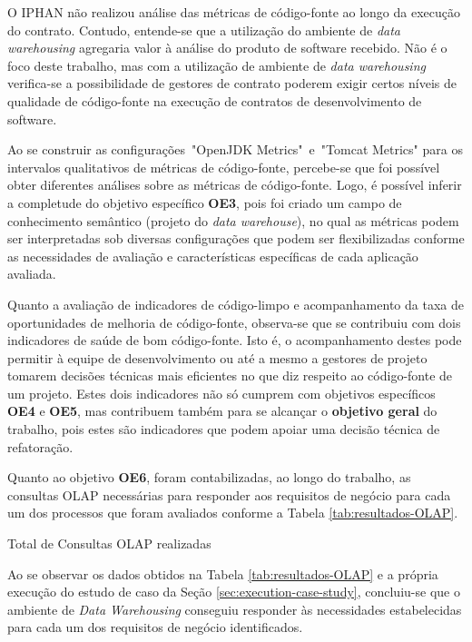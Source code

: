 O IPHAN não realizou análise das métricas de código-fonte ao longo da execução do contrato. Contudo, entende-se que a utilização do ambiente de \textit{data warehousing} agregaria valor à análise do produto de software recebido. Não é o foco deste trabalho, mas com a utilização de ambiente de \textit{data warehousing} verifica-se a possibilidade de gestores de contrato poderem exigir certos níveis de qualidade de código-fonte na execução de contratos de desenvolvimento de software.  

Ao se construir as  configurações~"OpenJDK Metrics"~e~"Tomcat Metrics" para os intervalos qualitativos de métricas de código-fonte, percebe-se que foi possível obter diferentes análises sobre as métricas de código-fonte. Logo, é possível inferir a completude do objetivo específico \textbf{OE3}, pois foi criado um campo de conhecimento semântico (projeto do \textit{data warehouse}), no qual as métricas podem ser interpretadas sob diversas configurações que podem ser flexibilizadas conforme as necessidades de avaliação e características específicas de cada aplicação avaliada.

Quanto a avaliação de indicadores de código-limpo e acompanhamento da taxa de oportunidades de melhoria de código-fonte, observa-se que se contribuiu com dois indicadores de saúde de bom código-fonte. Isto é, o acompanhamento destes pode permitir à equipe de desenvolvimento ou até a mesmo a gestores de projeto tomarem decisões técnicas mais eficientes no que diz respeito ao código-fonte de um projeto. Estes dois indicadores não só cumprem com objetivos específicos \textbf{OE4} e \textbf{OE5}, mas contribuem também para se alcançar o \textbf{objetivo geral} do trabalho, pois estes são indicadores que podem apoiar uma decisão técnica de refatoração.

Quanto ao objetivo \textbf{OE6}, foram contabilizadas, ao longo do trabalho, as consultas OLAP necessárias para responder aos requisitos de negócio para cada um dos processos que foram avaliados conforme a Tabela \ref{tab:resultados-OLAP}.

 
\begin{table}[H]
\begin{center}

\caption{Total de Consultas OLAP realizadas}
\label{tab:resultados-OLAP}
\end{center}
\end{table}
\FloatBarrier


Ao se observar os dados obtidos na Tabela \ref{tab:resultados-OLAP} e a própria execução do estudo de caso da Seção \ref{sec:execution-case-study}, concluiu-se que o ambiente de \textit{Data Warehousing} conseguiu responder às necessidades estabelecidas para cada um dos requisitos de negócio identificados. 

